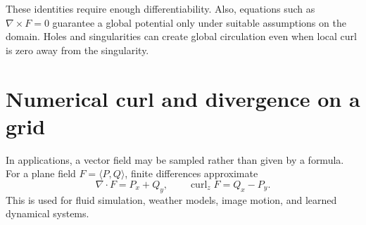 \documentclass[11pt]{article}
\newcommand{\grad}{\nabla}
\begin{document}
\begin{warningbox}
These identities require enough differentiability. Also, equations such as $\grad\times F=0$ guarantee a global potential only under suitable assumptions on the domain. Holes and singularities can create global circulation even when local curl is zero away from the singularity.
\end{warningbox}

\section{Numerical curl and divergence on a grid}

In applications, a vector field may be sampled rather than given by a formula. For a plane field $F=\langle P,Q\rangle$, finite differences approximate
\[
\grad\cdot F=P_x+Q_y,
\qquad
\operatorname{curl}_z F=Q_x-P_y.
\]
This is used for fluid simulation, weather models, image motion, and learned dynamical systems.
\end{document}
